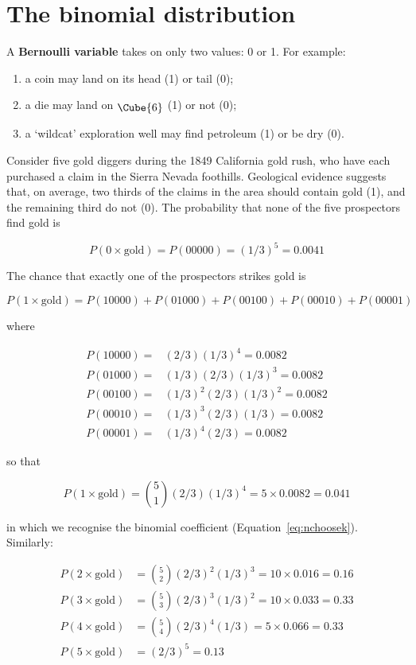 \chapter{The binomial distribution}
\label{ch:binomial}

A \textbf{Bernoulli variable} takes on only two values: 0 or 1. For
example:

\begin{enumerate}
\item a coin may land on its head (1) or tail (0);
\item a die may land on $\raisebox{-2pt}{\Cube{6}}$ (1) or not (0);
\item a `wildcat' exploration well may find petroleum (1) or be dry (0).
\end{enumerate}

Consider five gold diggers during the 1849 California gold rush, who
have each purchased a claim in the Sierra Nevada foothills. Geological
evidence suggests that, on average, two thirds of the claims in the
area should contain gold (1), and the remaining third do not (0). The
probability that none of the five prospectors find gold is

\[
P(0\times\mbox{gold}) = P(00000) = (1/3)^5 = 0.0041
\]

The chance that exactly one of the prospectors strikes gold is

\[
P(1\times\mbox{gold}) = P(10000) + P(01000) + P(00100) + P(00010) + P(00001)
\]

\noindent where

\begin{align*}
  P(10000) = & (2/3) (1/3)^4 = 0.0082 \\
  P(01000) = & (1/3) (2/3) (1/3)^3 = 0.0082 \\
  P(00100) = & (1/3)^2 (2/3) (1/3)^2 = 0.0082 \\
  P(00010) = & (1/3)^3 (2/3) (1/3) = 0.0082 \\
  P(00001) = & (1/3)^4 (2/3) = 0.0082
\end{align*}

\noindent so that

\[
P(1\times\mbox{gold}) = \binom{5}{1} (2/3) (1/3)^4 = {5}\times{0.0082} = 0.041
\]

\noindent in which we recognise the binomial coefficient
(Equation~\ref{eq:nchoosek}). Similarly:

\begin{align*}
P(2\times\mbox{gold}) & = \binom{5}{2} (2/3)^2 (1/3)^3 = {10}\times{0.016} = 0.16\\
P(3\times\mbox{gold}) & = \binom{5}{3} (2/3)^3 (1/3)^2 = {10}\times{0.033} = 0.33\\
P(4\times\mbox{gold}) & = \binom{5}{4} (2/3)^4 (1/3) = {5}\times{0.066} = 0.33\\
P(5\times\mbox{gold}) & = (2/3)^5 = 0.13
\end{align*}

